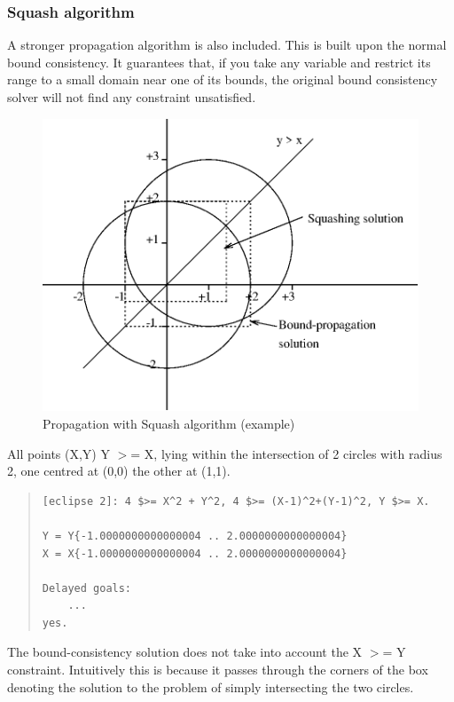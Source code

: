 \subsubsection{Squash algorithm}

A stronger propagation algorithm is also included. This is built upon the
normal bound consistency. It guarantees that, if you take any variable
and restrict its range to a small domain near one of its bounds,
the original bound consistency solver will not find any constraint
unsatisfied.

\begin{figure}
\includegraphics{example1.eps}
\caption{Propagation with Squash algorithm (example)}
\end{figure}

All points (X,Y) Y $>$= X, lying within the intersection of 2 circles with
radius 2, one centred at (0,0) the other at (1,1).
\begin{quote}
\begin{verbatim}
[eclipse 2]: 4 $>= X^2 + Y^2, 4 $>= (X-1)^2+(Y-1)^2, Y $>= X.

Y = Y{-1.0000000000000004 .. 2.0000000000000004}
X = X{-1.0000000000000004 .. 2.0000000000000004}

Delayed goals:
    ...
yes.
\end{verbatim}
\end{quote}
The bound-consistency solution does not take into account the X $>$= Y
constraint. Intuitively this is because it passes through the corners
of the box denoting the solution to the problem of simply intersecting
the two circles.

